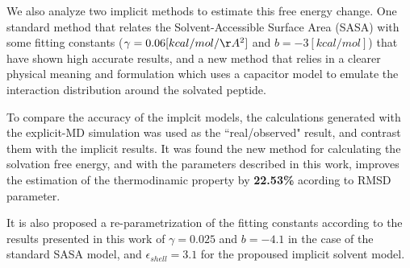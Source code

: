 We also analyze two implicit methods to estimate this free energy change. One standard method that relates the Solvent-Accessible Surface Area (SASA) with some fitting constants ($\gamma = 0.06 [kcal/mol/\AA^2]$ and $b = -3 [kcal/mol]$) that have shown high accurate results, and a new method that relies in a clearer physical meaning and formulation which uses a capacitor model to emulate the interaction distribution around the solvated peptide. 

To compare the accuracy of the implcit models, the calculations generated with the explicit-MD simulation was used as the ``real/observed" result, and contrast them with the implicit results. It was found the new method for calculating the solvation free energy, and with the parameters described in this work, improves the estimation of the thermodinamic property by \textbf{22.53\%} acording to RMSD parameter. 

It is also proposed a re-parametrization of the fitting constants according to the results presented in this work of $\gamma = 0.025$ and $b = -4.1$ in the case of the standard SASA model, and $\epsilon_{shell}=3.1$ for the propoused implicit solvent model. 




 